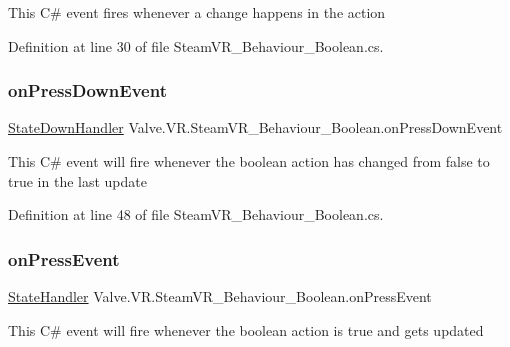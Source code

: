 This C\# event fires whenever a change happens in the action 



Definition at line 30 of file Steam\+V\+R\+\_\+\+Behaviour\+\_\+\+Boolean.\+cs.

\mbox{\label{class_valve_1_1_v_r_1_1_steam_v_r___behaviour___boolean_a190d1f5b2453778d2403f0389d31621b}} 
\subsubsection{\texorpdfstring{onPressDownEvent}{onPressDownEvent}}
{\footnotesize\ttfamily \mbox{\hyperlink{class_valve_1_1_v_r_1_1_steam_v_r___behaviour___boolean_a72b8998f8432175c0bdeec28b33eeb48}{State\+Down\+Handler}} Valve.\+V\+R.\+Steam\+V\+R\+\_\+\+Behaviour\+\_\+\+Boolean.\+on\+Press\+Down\+Event}



This C\# event will fire whenever the boolean action has changed from false to true in the last update 



Definition at line 48 of file Steam\+V\+R\+\_\+\+Behaviour\+\_\+\+Boolean.\+cs.

\mbox{\label{class_valve_1_1_v_r_1_1_steam_v_r___behaviour___boolean_a1e55199fdcd5d8fa714e0ba802b5210f}} 
\subsubsection{\texorpdfstring{onPressEvent}{onPressEvent}}
{\footnotesize\ttfamily \mbox{\hyperlink{class_valve_1_1_v_r_1_1_steam_v_r___behaviour___boolean_a915c126540f6be14cd925ac1679649af}{State\+Handler}} Valve.\+V\+R.\+Steam\+V\+R\+\_\+\+Behaviour\+\_\+\+Boolean.\+on\+Press\+Event}



This C\# event will fire whenever the boolean action is true and gets updated 



